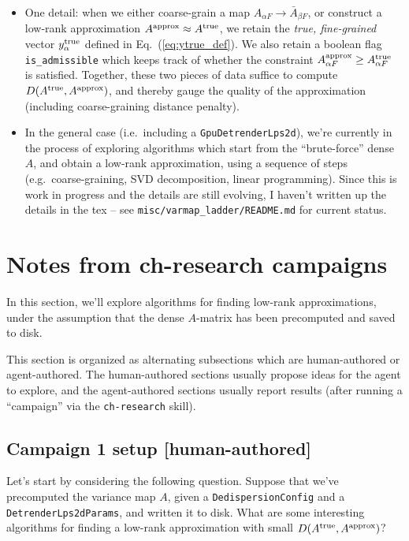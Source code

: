 \documentclass{article}
\numberwithin{equation}{section}   %
\begin{document}
\begin{itemize}
\item One detail: when we either coarse-grain a map $A_{\alpha F} \rightarrow \bar A_{\beta F}$,
 or construct a low-rank approximation $A^{\rm approx} \approx A^{\rm true}$, we retain
 the {\em true, fine-grained} vector $y^{\rm true}_\alpha$ defined in Eq.\ (\ref{eq:ytrue_def}).
 We also retain a boolean flag \verb|is_admissible| which keeps track of whether the constraint
 $A^{\rm approx}_{\alpha F} \ge A^{\rm true}_{\alpha F}$ is satisfied.
 Together, these two pieces of data suffice to compute $D(A^{\rm true}, A^{\rm approx})$, and
 thereby gauge the quality of the approximation (including coarse-graining distance penalty).

\item In the general case (i.e.\ including a {\tt GpuDetrenderLps2d}), we're currently in the
 process of exploring algorithms which start from the ``brute-force'' dense $A$, and
 obtain a low-rank approximation, using a sequence of steps (e.g.\ coarse-graining,
 SVD decomposition, linear programming).
 Since this is work in progress and the details are still evolving,
 I haven't written up the details in the tex -- see {\tt misc/varmap\_ladder/README.md}
 for current status.

\end{itemize}

\section{Notes from ch-research campaigns}
\label{sec:first_milestone}

In this section, we'll explore algorithms for finding low-rank approximations,
under the assumption that the dense $A$-matrix has been precomputed and saved to disk.

This section is organized as alternating subsections which are human-authored
or agent-authored.
The human-authored sections usually propose ideas for the agent to explore, and the
agent-authored sections usually report results (after running a ``campaign'' via the
\verb|ch-research| skill).

\subsection{Campaign 1 setup [human-authored]}

Let's start by considering the following question.
Suppose that we've precomputed the variance map $A$, given a {\tt DedispersionConfig} 
and a {\tt DetrenderLps2dParams}, and written it to disk.
What are some interesting algorithms for finding a low-rank approximation with
small $D(A^{\rm true}, A^{\rm approx})$?
\end{document}
